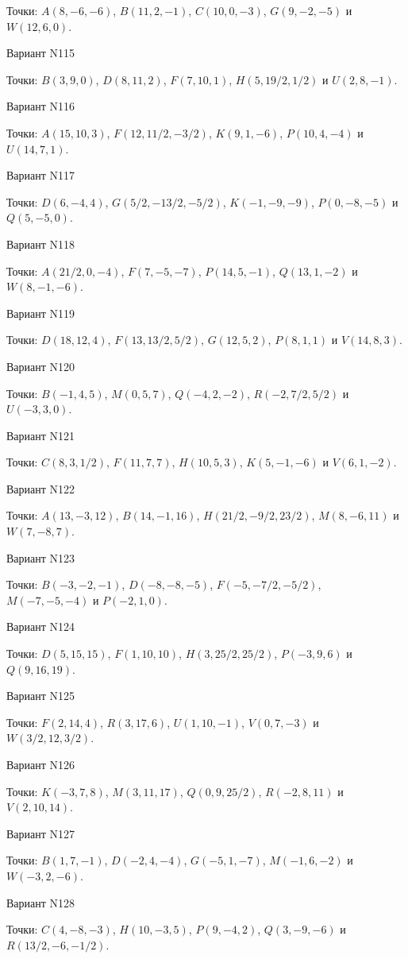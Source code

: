 \documentclass[11pt]{report}
\begin{document}
Точки: $A(8, -6, -6)$, $B(11, 2, -1)$, $C(10, 0, -3)$, $G(9, -2, -5)$ и $W(12, 6, 0)$.

Вариант N115

Точки: $B(3, 9, 0)$, $D(8, 11, 2)$, $F(7, 10, 1)$, $H(5, 19/2, 1/2)$ и $U(2, 8, -1)$.

Вариант N116

Точки: $A(15, 10, 3)$, $F(12, 11/2, -3/2)$, $K(9, 1, -6)$, $P(10, 4, -4)$ и $U(14, 7, 1)$.

Вариант N117

Точки: $D(6, -4, 4)$, $G(5/2, -13/2, -5/2)$, $K(-1, -9, -9)$, $P(0, -8, -5)$ и $Q(5, -5, 0)$.

Вариант N118

Точки: $A(21/2, 0, -4)$, $F(7, -5, -7)$, $P(14, 5, -1)$, $Q(13, 1, -2)$ и $W(8, -1, -6)$.

Вариант N119

Точки: $D(18, 12, 4)$, $F(13, 13/2, 5/2)$, $G(12, 5, 2)$, $P(8, 1, 1)$ и $V(14, 8, 3)$.

Вариант N120

Точки: $B(-1, 4, 5)$, $M(0, 5, 7)$, $Q(-4, 2, -2)$, $R(-2, 7/2, 5/2)$ и $U(-3, 3, 0)$.

Вариант N121

Точки: $C(8, 3, 1/2)$, $F(11, 7, 7)$, $H(10, 5, 3)$, $K(5, -1, -6)$ и $V(6, 1, -2)$.

Вариант N122

Точки: $A(13, -3, 12)$, $B(14, -1, 16)$, $H(21/2, -9/2, 23/2)$, $M(8, -6, 11)$ и $W(7, -8, 7)$.

Вариант N123

Точки: $B(-3, -2, -1)$, $D(-8, -8, -5)$, $F(-5, -7/2, -5/2)$, $M(-7, -5, -4)$ и $P(-2, 1, 0)$.

Вариант N124

Точки: $D(5, 15, 15)$, $F(1, 10, 10)$, $H(3, 25/2, 25/2)$, $P(-3, 9, 6)$ и $Q(9, 16, 19)$.

Вариант N125

Точки: $F(2, 14, 4)$, $R(3, 17, 6)$, $U(1, 10, -1)$, $V(0, 7, -3)$ и $W(3/2, 12, 3/2)$.

Вариант N126

Точки: $K(-3, 7, 8)$, $M(3, 11, 17)$, $Q(0, 9, 25/2)$, $R(-2, 8, 11)$ и $V(2, 10, 14)$.

Вариант N127

Точки: $B(1, 7, -1)$, $D(-2, 4, -4)$, $G(-5, 1, -7)$, $M(-1, 6, -2)$ и $W(-3, 2, -6)$.

Вариант N128

Точки: $C(4, -8, -3)$, $H(10, -3, 5)$, $P(9, -4, 2)$, $Q(3, -9, -6)$ и $R(13/2, -6, -1/2)$.
\end{document}
